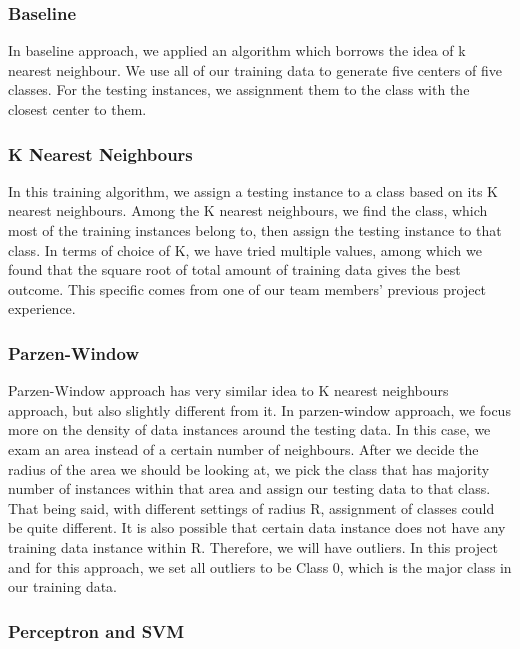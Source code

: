 \documentclass{article} %
\begin{document}
\subsubsection{Baseline}

In baseline approach, we applied an algorithm which borrows the idea of k nearest neighbour. We use all of our training data to generate five centers of  five classes. For the testing instances, we assignment them to the class with the closest center to them.

\subsubsection{K Nearest Neighbours}

In this training algorithm, we assign a testing instance to a class based on its K nearest neighbours. Among the K nearest neighbours, we find the class, which most of the training instances belong to, then assign the testing instance to that class. In terms of choice of K, we have tried multiple values, among which we found that the square root of total amount of training data gives the best outcome. This specific comes from one of our team members’ previous project experience.

\subsubsection{Parzen-Window}

Parzen-Window approach has very similar idea to K nearest neighbours approach, but also slightly different from it. In parzen-window approach, we focus more on the density of data instances around the testing data. In this case, we exam an area instead of a certain number of neighbours. After we decide the radius of the area we should be looking at, we pick the class that has majority number of instances within that area and assign our testing data to that class. That being said, with different settings of radius R, assignment of classes could be quite different. It is also possible that certain data instance does not have any training data instance within R. Therefore, we will have outliers. In this project and for this approach, we set all outliers to be Class 0, which is the major class in our training data.

\subsubsection{Perceptron and SVM}
\end{document}
